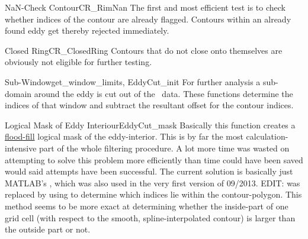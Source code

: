 \begin{filter}{NaN-Check Contour}{CR_RimNan}
The first and most efficient test is to check whether indices of the
contour are already flagged. Contours within an already found eddy get thereby
rejected immediately.
\end{filter}\newline
\begin{filter}{Closed Ring}{CR_ClosedRing}
Contours that do not close onto themselves are obviously not eligible for
further testing.
\end{filter}\newline
\begin{filter}{Sub-Window}{get_window_limits, EddyCut_init}
For further analysis a sub-domain around the eddy is cut out of the \SSH~data.
These functions determine the indices of that window and subtract the
resultant offset for the contour indices.
\end{filter}\newline
\begin{filter}{Logical Mask of Eddy Interiour}{EddyCut_mask}
\label{filter:cutmask}
Basically this function creates a \href{http://en.wikipedia.org/wiki/Flood_fill}{flood-fill} logical mask of the
eddy-interior. This is by far the most calculation-intensive part of the whole
filtering procedure. A lot more time was wasted on attempting to solve this
problem more efficiently than time could have been saved would said attempts
have
been successful. The current solution is basically just MATLAB's , which was also used in the very first version of 09/2013.
EDIT:  was replaced by using  to determine which indices lie within the contour-polygon. This method seems to be more exact at determining whether the inside-part of one grid cell (with respect to the smooth, spline-interpolated contour) is larger than the outside part or not.
\end{filter}\newline
